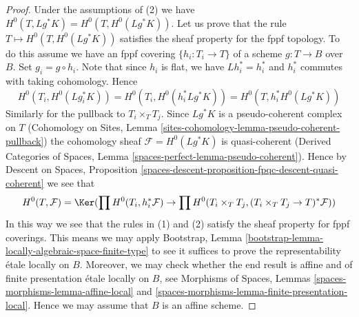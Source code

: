 \begin{proof}
Under the assumptions of (2) we have $H^0(T, Lg^*K) = H^0(T, H^0(Lg^*K))$.
Let us prove that the rule $T \mapsto H^0(T, H^0(Lg^*K))$ satisfies the
sheaf property for the fppf topology. To do this assume we have an
fppf covering $\{h_i : T_i \to T\}$ of a scheme $g : T \to B$ over $B$.
Set $g_i = g \circ h_i$. Note that since $h_i$ is flat, we have
$Lh_i^* = h_i^*$ and $h_i^*$ commutes with taking cohomology. Hence
$$
H^0(T_i, H^0(Lg_i^*K)) =
H^0(T_i, H^0(h_i^*Lg^*K)) =
H^0(T, h_i^*H^0(Lg^*K))
$$
Similarly for the pullback to $T_i \times_T T_j$.
Since $Lg^*K$ is a pseudo-coherent complex on $T$
(Cohomology on Sites, Lemma
\ref{sites-cohomology-lemma-pseudo-coherent-pullback})
the cohomology sheaf $\mathcal{F} = H^0(Lg^*K)$ is quasi-coherent
(Derived Categories of Spaces, Lemma
\ref{spaces-perfect-lemma-pseudo-coherent}).
Hence by Descent on Spaces, Proposition
\ref{spaces-descent-proposition-fpqc-descent-quasi-coherent}
we see that
$$
H^0(T, \mathcal{F}) = \Ker(
\prod H^0(T_i, h_i^*\mathcal{F}) \to
\prod H^0(T_i \times_T T_j, (T_i \times_T T_j \to T)^*\mathcal{F}))
$$
In this way we see that the rules in (1) and (2) satisfy
the sheaf property for fppf coverings. This means we may apply
Bootstrap, Lemma \ref{bootstrap-lemma-locally-algebraic-space-finite-type}
to see it suffices to prove the representability \'etale locally on $B$.
Moreover, we may check whether the end result is affine and
of finite presentation \'etale locally on $B$, see
Morphisms of Spaces, Lemmas \ref{spaces-morphisms-lemma-affine-local} and
\ref{spaces-morphisms-lemma-finite-presentation-local}.
Hence we may assume that $B$ is an affine scheme.


\end{proof}
